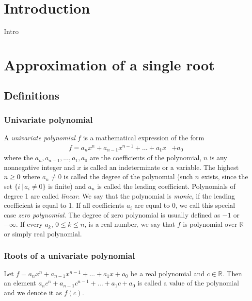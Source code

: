\documentclass[
  digital, %
  table,   %
  nolof,     %
  nolot,     %
	draft, %
]{fithesis3}
\begin{document}
\newtheorem{theorem}{Theorem}[section] %
\newtheorem{corollary}[theorem]{Corollary}
\chapter{Introduction}
Intro

\chapter{Approximation of a single root}
\section{Definitions}
\subsection{Univariate polynomial}
A \emph{univariate polynomial} $f$ is a mathematical expression of the form
\begin{align}
       f = a_{n}x^{n}  +  a_{n-1}x^{n-1} +  \ldots  +  a_{1}x  &+  a_{0} \label{eq:polynom}
\end{align}
\newcommand{\R}{\mathbb{R}}
\newcommand{\N}{\mathbb{N}}
where the $a_{n}, a_{n-1}, \ldots, a_{1}, a_{0}$  are the coefficients of the polynomial, $n$ is any nonnegative integer and $x$ is called an indeterminate or a variable.  The highest $n \geq 0$ where $a_{n} \neq 0$ is called the degree of the polynomial (such $n$ exists, since the set $\{i \, | \, a_{i} \neq 0 \}$ is finite) and $a_{n}$ is called the leading coefficient. Polynomials of degree 1 are called \emph{linear}. We say that the polynomial is \emph{monic}, if the leading coefficient is equal to 1. If all coefficients $a_{i}$ are equal to $0$, we call this special case \emph{zero polynomial}. The degree of zero polynomial is usually defined as $-1$ or $-\infty$. If every $a_{k}$, $0\leq{k}\leq{n}$, is a real number, we say that $f$ is polynomial over $\R$ or simply real polynomial.

\subsection{Roots of a univariate polynomial}
Let $f = a_{n}x^{n}  +  a_{n-1}x^{n-1} +  \ldots  +  a_{1}x  +  a_{0}$ be a real polynomial and $c\in\R$. Then an element $a_{n}c^{n}  +  a_{n-1}c^{n-1} +  \ldots  +  a_{1}c  +  a_{0}$ is called a value of the polynomial and we denote it as $f(c)$.
\end{document}
